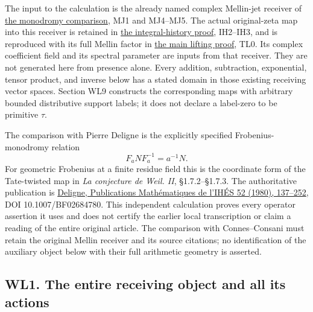The input to the calculation is the already named complex Mellin-jet
receiver of
\href{../deligne_quotient_weight_20260924/MONODROMY_JET_COMPARISON.md}{the
monodromy comparison}, MJ1 and MJ4--MJ5. The actual original-zeta map
into this receiver is retained in
\href{../integrality_purity_20260924/INTEGRAL_HISTORY_AND_PURITY.md}{the
integral-history proof}, IH2--IH3, and is reproduced with its full
Mellin factor in \href{TAU_LIFTING_AND_WEIGHT_SEPARATION.md}{the main
lifting proof}, TL0. Its complex coefficient field and its spectral
parameter are inputs from that receiver. They are not generated here
from presence alone. Every addition, subtraction, exponential, tensor
product, and inverse below has a stated domain in those existing
receiving vector spaces. Section WL9 constructs the corresponding maps
with arbitrary bounded distributive support labels; it does not declare
a label-zero to be primitive \(\tau\).

The comparison with Pierre Deligne is the explicitly specified
Frobenius-monodromy relation \[
 F_aN F_a^{-1}=a^{-1}N.
\tag{WL0.1}
\] For geometric Frobenius at a finite residue field this is the
coordinate form of the Tate-twisted map in \emph{La conjecture de Weil.
II}, §1.7.2--§1.7.3. The authoritative publication is
\href{https://www.numdam.org/item/PMIHES_1980__52__137_0/}{Deligne,
Publications Mathématiques de l'IHÉS 52 (1980), 137--252}, DOI
10.1007/BF02684780. This independent calculation proves every operator
assertion it uses and does not certify the earlier local transcription
or claim a reading of the entire original article. The comparison with
Connes--Consani must retain the original Mellin receiver and its source
citations; no identification of the auxiliary object below with their
full arithmetic geometry is asserted.

\subsection{WL1. The entire receiving object and all its
actions}\label{wl1.-the-entire-receiving-object-and-all-its-actions}

